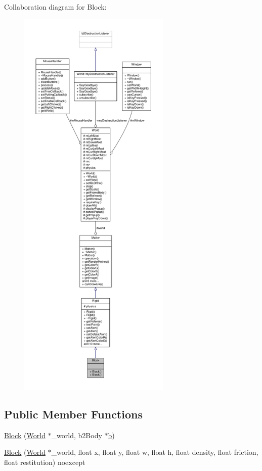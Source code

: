 Collaboration diagram for Block\+:\nopagebreak
\begin{figure}[H]
\begin{center}
\leavevmode
\includegraphics[height=550pt]{classBlock__coll__graph}
\end{center}
\end{figure}
\subsection*{Public Member Functions}
\begin{DoxyCompactItemize}
\item 
\hyperlink{classBlock_aae3e29e7e018dd11531c7ac7acbcc4b6}{Block} (\hyperlink{classWorld}{World} $\ast$\+\_\+world, b2\+Body $\ast$\hyperlink{image_8h_ab2d05693952610f937e5acb3c4a8fa1b}{b})
\item 
\hyperlink{classBlock_a2a61e69a3b1e77cb87fbd00da334b030}{Block} (\hyperlink{classWorld}{World} $\ast$\+\_\+world, float x, float y, float w, float h, float density, float friction, float restitution) noexcept
\end{DoxyCompactItemize}
